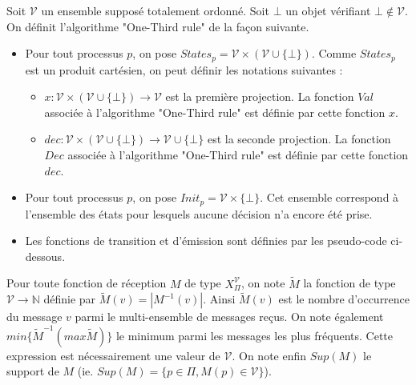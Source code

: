 \documentclass{article}
\begin{document}
Soit $\mathcal{V}$ un ensemble supposé totalement ordonné. Soit $\bot$ un objet vérifiant $\bot \notin \mathcal{V}$.
On définit l'algorithme "One-Third rule" de la façon suivante.
\begin{itemize}
	\item Pour tout processus $p$, on pose $States_p = \mathcal{V} \times (\mathcal{V} \cup \{ \bot \})$.
	Comme $States_p$ est un produit cartésien, on peut définir les notations suivantes :
	\begin{itemize}

		\item $x : \mathcal{V} \times (\mathcal{V} \cup \{ \bot \}) \rightarrow \mathcal{V}$ est la première projection.
			La fonction $Val$ associée à l'algorithme "One-Third rule" est définie par cette fonction $x$.
		\item $dec : \mathcal{V} \times (\mathcal{V} \cup \{ \bot \}) \rightarrow \mathcal{V} \cup \{\bot\}$ est la seconde projection.
			La fonction $Dec$ associée à l'algorithme "One-Third rule" est définie par cette fonction $dec$.

	\end{itemize}
\item Pour tout processus $p$, on pose $Init_p = \mathcal{V} \times \{ \bot \}$. Cet ensemble correspond à l'ensemble des états pour lesquels aucune décision n'a encore été prise.
\item Les fonctions de transition et d'émission sont définies par les pseudo-code ci-dessous.
\end{itemize}
Pour toute fonction de réception $M$ de type $X_\Pi^\mathcal{V}$, on note $\widetilde{M}$ la fonction de type $\mathcal{V} \rightarrow \mathds{N}$ définie par $\widetilde{M}(v) = |M^{-1}(v)|$.
Ainsi $\widetilde{M}(v)$ est le nombre d'occurrence du message $v$ parmi le multi-ensemble de messages reçus.
On note également $min \{\widetilde{M}^{-1} (max \widetilde{M})\}$  le minimum parmi les messages les plus fréquents. Cette expression est nécessairement une valeur de $\mathcal{V}$.
On note enfin $Sup(M)$ le support de $M$ (ie. $Sup(M) = \{p \in \Pi, M(p) \in \mathcal{V}\}$). 
\end{document}

